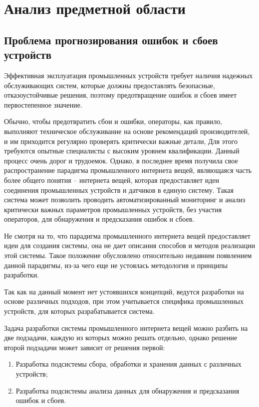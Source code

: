 \section{Анализ предметной области}

\subsection{Проблема прогнозирования ошибок и сбоев устройств}

Эффективная эксплуатация промышленных устройств
требует наличия надежных обслуживающих систем,
которые должны предоставлять безопасные, отказоустойчивые решения,
поэтому предотвращение ошибок и сбоев имеет первостепенное значение.

Обычно, чтобы предотвратить сбои и ошибки, операторы,
как правило, выполняют техническое обслуживание 
на основе рекомендаций производителей, 
и им приходится регулярно проверять критически важные детали,
Для этого требуются опытные специалисты с высоким уровнем квалификации.
Данный процесс очень дорог и трудоемок.
Однако, в последнее время получила свое распространение
парадигма промышленного интернета вещей,
являющаяся часть более общего понятия -- интернета вещей,
которая предоставляет идеи соединения
промышленных устройств и датчиков в единую систему.
Такая система может позволить проводить автоматизированный мониторинг и 
анализ критически важных параметров промышленных устройств,
без участия операторов, для обнаружения и предсказания ошибок и сбоев. \cite{iiot}

Не смотря на то, что парадигма промышленного интернета вещей предоставляет идеи
для создания системы, она не дает описания способов и методов реализации этой системы.
Такое положение обусловлено относительно недавним появлением данной парадигмы,
из-за чего еще не устоялась методология и принципы разработки.

Так как на данный момент нет устоявшихся концепций,
ведутся разработки на основе различных подходов,
при этом учитывается специфика промышленных устройств,
для которых разрабатывается система.

Задача разработки системы промышленного интернета вещей можно разбить на две подзадачи,
каждую из которых можно решать отдельно, однако решение второй подзадачи может зависит от решения первой:

\begin{enumerate}
    \item Разработка подсистемы сбора, обработки и хранения данных с различных устройств;
    \item Разработка подсистемы анализа данных для обнаружения и предсказания ошибок и сбоев.
\end{enumerate}

